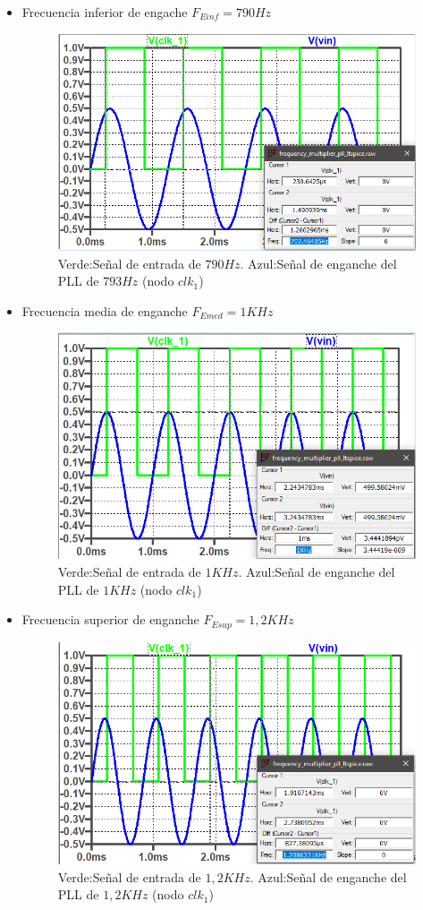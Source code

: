\documentclass[10pt,a4paper]{IEEEtran}
\begin{document}
\begin{itemize}
    \item Frecuencia inferior de engache $F_{Einf} =790Hz$
    \begin{figure}[H]
        \centering
        \includegraphics[width=.45\textwidth]{Fig/Engancheinferior}
        \caption{Verde:Señal de entrada de $790Hz$. Azul:Señal de enganche del PLL de $793Hz$ (nodo $clk_1$)}
        \label{Einf}
    \end{figure}
    \item Frecuencia media de enganche $F_{Emed}=1KHz$
    \begin{figure}[H]
        \centering
        \includegraphics[width=.45\textwidth]{Fig/EngancheMedio}
        \caption{Verde:Señal de entrada de $1KHz$. Azul:Señal de enganche del PLL de $1KHz$ (nodo $clk_1$)}
        \label{Emed}
    \end{figure} 
    \item Frecuencia superior de enganche $F_{Esup}=1,2KHz$
    \begin{figure}[H]
        \centering
        \includegraphics[width=.45\textwidth]{Fig/EngancheSuperior}
        \caption{Verde:Señal de entrada de $1,2KHz$. Azul:Señal de enganche del PLL de $1,2KHz$ (nodo $clk_1$)}
        \label{Esup}
    \end{figure}
\end{itemize}  
\end{document}
